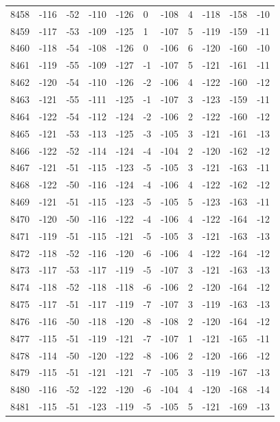 \begin{table}[H]
\begin{tabular}{lllllllllll}
8458 & -116 & -52 & -110 & -126 & 0 & -108 & 4 & -118 & -158 & -10 \\
8459 & -117 & -53 & -109 & -125 & 1 & -107 & 5 & -119 & -159 & -11 \\
8460 & -118 & -54 & -108 & -126 & 0 & -106 & 6 & -120 & -160 & -10 \\
8461 & -119 & -55 & -109 & -127 & -1 & -107 & 5 & -121 & -161 & -11 \\
8462 & -120 & -54 & -110 & -126 & -2 & -106 & 4 & -122 & -160 & -12 \\
8463 & -121 & -55 & -111 & -125 & -1 & -107 & 3 & -123 & -159 & -11 \\
8464 & -122 & -54 & -112 & -124 & -2 & -106 & 2 & -122 & -160 & -12 \\
8465 & -121 & -53 & -113 & -125 & -3 & -105 & 3 & -121 & -161 & -13 \\
8466 & -122 & -52 & -114 & -124 & -4 & -104 & 2 & -120 & -162 & -12 \\
8467 & -121 & -51 & -115 & -123 & -5 & -105 & 3 & -121 & -163 & -11 \\
8468 & -122 & -50 & -116 & -124 & -4 & -106 & 4 & -122 & -162 & -12 \\
8469 & -121 & -51 & -115 & -123 & -5 & -105 & 5 & -123 & -163 & -11 \\
8470 & -120 & -50 & -116 & -122 & -4 & -106 & 4 & -122 & -164 & -12 \\
8471 & -119 & -51 & -115 & -121 & -5 & -105 & 3 & -121 & -163 & -13 \\
8472 & -118 & -52 & -116 & -120 & -6 & -106 & 4 & -122 & -164 & -12 \\
8473 & -117 & -53 & -117 & -119 & -5 & -107 & 3 & -121 & -163 & -13 \\
8474 & -118 & -52 & -118 & -118 & -6 & -106 & 2 & -120 & -164 & -12 \\
8475 & -117 & -51 & -117 & -119 & -7 & -107 & 3 & -119 & -163 & -13 \\
8476 & -116 & -50 & -118 & -120 & -8 & -108 & 2 & -120 & -164 & -12 \\
8477 & -115 & -51 & -119 & -121 & -7 & -107 & 1 & -121 & -165 & -11 \\
8478 & -114 & -50 & -120 & -122 & -8 & -106 & 2 & -120 & -166 & -12 \\
8479 & -115 & -51 & -121 & -121 & -7 & -105 & 3 & -119 & -167 & -13 \\
8480 & -116 & -52 & -122 & -120 & -6 & -104 & 4 & -120 & -168 & -14 \\
8481 & -115 & -51 & -123 & -119 & -5 & -105 & 5 & -121 & -169 & -13 \\

\end{tabular}
\end{table}
